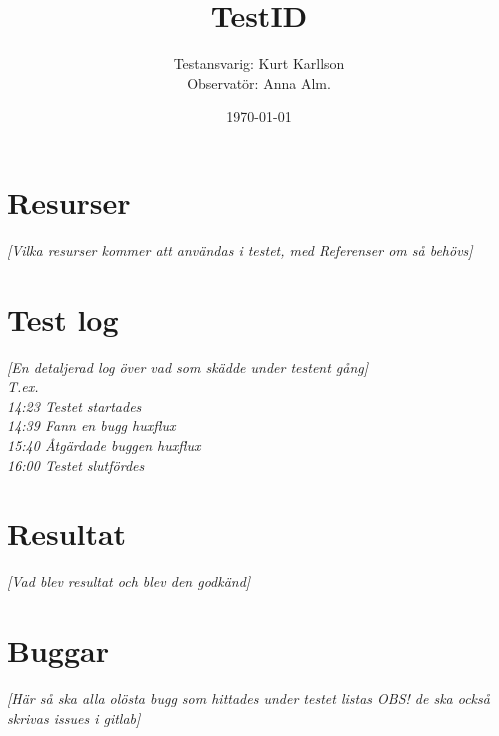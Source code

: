 \documentclass[a4paper,10pt, twoside]{article}
\title{TestID}
\author{Testansvarig: Kurt Karllson\\Observatör: Anna Alm.}
\date{\today}
\begin{document}
\maketitle\clearpage

\section{Resurser}
\emph{[Vilka resurser kommer att användas i testet, med Referenser om så behövs]}

\section{Test log}
\emph{[En detaljerad log över vad som skädde under testent gång]\\
T.ex. \\ 14:23 Testet startades \\ 14:39 Fann en bugg huxflux \\ 15:40 Åtgärdade buggen huxflux \\ 16:00 Testet slutfördes}
\

\section{Resultat}
\emph{[Vad blev resultat och blev den godkänd]}

\section{Buggar}
\emph{[Här så ska alla olösta bugg som hittades under testet listas OBS! de ska också skrivas issues i gitlab]}
\end{document}
